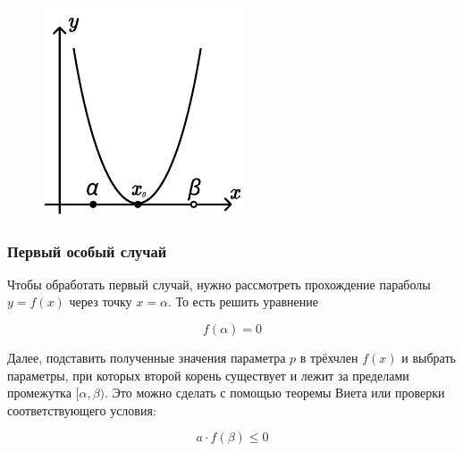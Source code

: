 \begin {figure} [h]
\begin {minipage} [t] {0.3\linewidth}
    \end {minipage}
    \hfill
    \begin {minipage} [t] {0.3\linewidth}
        \centering
        \includegraphics [width=\linewidth] {image/image_04.pdf}
    \end {minipage}
\end {figure}

\subsubsection {Первый особый случай}
Чтобы обработать первый случай, нужно рассмотреть прохождение параболы $y = f(x)$ через точку 
$x = \alpha$. То есть решить уравнение

\begin {equation*}
    f(\alpha) = 0
\end {equation*}

Далее, подставить полученные значения параметра $p$ в трёхчлен $f(x)$ и выбрать параметры, при
которых второй корень существует и лежит за пределами промежутка $[\alpha, \beta)$. Это можно
сделать с помощью теоремы Виета или проверки соответствующего условия:

\begin {equation*}
    a \cdot f(\beta) \leqslant 0
\end {equation*}
  
